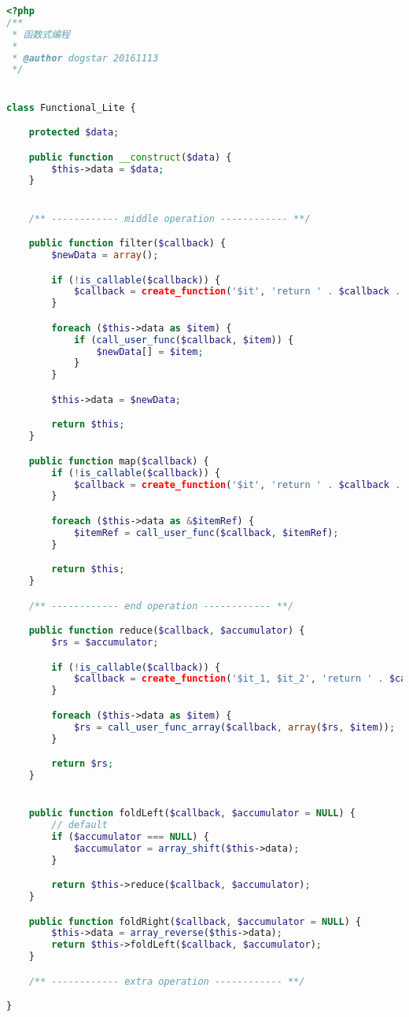 \begin{lstlisting}[language=PHP]
<?php
/**
 * 函数式编程
 *
 * @author dogstar 20161113
 */


class Functional_Lite {

    protected $data;

    public function __construct($data) {
        $this->data = $data;
    }


    /** ------------ middle operation ------------ **/

    public function filter($callback) {
        $newData = array();

        if (!is_callable($callback)) {
            $callback = create_function('$it', 'return ' . $callback . ';');
        }

        foreach ($this->data as $item) {
            if (call_user_func($callback, $item)) {
                $newData[] = $item;
            }
        }

        $this->data = $newData;

        return $this;
    }

    public function map($callback) {
        if (!is_callable($callback)) {
            $callback = create_function('$it', 'return ' . $callback . ';');
        }

        foreach ($this->data as &$itemRef) {
            $itemRef = call_user_func($callback, $itemRef);
        }

        return $this;
    }

    /** ------------ end operation ------------ **/

    public function reduce($callback, $accumulator) {
        $rs = $accumulator;

        if (!is_callable($callback)) {
            $callback = create_function('$it_1, $it_2', 'return ' . $callback . ';');
        }

        foreach ($this->data as $item) {
            $rs = call_user_func_array($callback, array($rs, $item));
        }

        return $rs;
    }


    public function foldLeft($callback, $accumulator = NULL) {
        // default
        if ($accumulator === NULL) {
            $accumulator = array_shift($this->data);
        }

        return $this->reduce($callback, $accumulator);
    }

    public function foldRight($callback, $accumulator = NULL) {
        $this->data = array_reverse($this->data);
        return $this->foldLeft($callback, $accumulator);
    }

    /** ------------ extra operation ------------ **/

}
\end{lstlisting}

